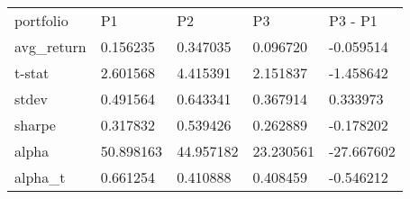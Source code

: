 \begin{tabular}{lllll}
\toprule
\midrule
portfolio & P1 & P2 & P3 & P3 - P1 \\
avg_return & 0.156235 & 0.347035 & 0.096720 & -0.059514 \\
t-stat & 2.601568 & 4.415391 & 2.151837 & -1.458642 \\
stdev & 0.491564 & 0.643341 & 0.367914 & 0.333973 \\
sharpe & 0.317832 & 0.539426 & 0.262889 & -0.178202 \\
alpha & 50.898163 & 44.957182 & 23.230561 & -27.667602 \\
alpha_t & 0.661254 & 0.410888 & 0.408459 & -0.546212 \\
\bottomrule
\end{tabular}
